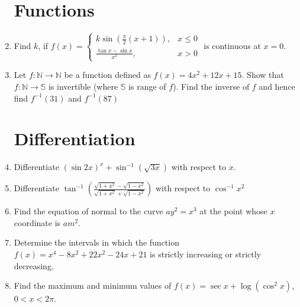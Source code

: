 \documentclass[12pt,-letter paper]{article}
\providecommand{\brak}[1]{\ensuremath{\left(#1\right)}}
\theoremstyle{remark}
\begin{document}
\begin{enumerate}
\section{Functions}
\item Find $k$, if $f(x) = 
    \begin{cases} 
        k \sin \brak{\frac{\pi}{2}\brak{x+1}},& x \leq 0 \\ 
        \frac{\tan x - \sin x}{x^3},& x > 0 
    \end{cases}$ is continuous at $x = 0$.
\item Let $f : \mathbb{N} \xrightarrow{} \mathbb{N}$ be a function defined as $f(x) = 4x^2 + 12x + 15$. Show that $f : \mathbb{N} \xrightarrow{} \mathbb{S}$ is invertible (where $\mathbb{S}$ is range of $f$). Find the inverse of $f$ and hence find $f^{-1}(31)$ and $f^{-1}(87)$
\section{Differentiation}
\item Differentiate $\brak{\sin 2x}^x + \sin^{-1}\brak{\sqrt{3x}}$ with respect to $x$.
\item Differentiate $\tan^{-1}\brak{\frac{\sqrt{1 + x^2} - \sqrt{1 - x^2}}{\sqrt{1 + x^2} + \sqrt{1 - x^2}}}$ with respect to $\cos^{-1}x^2$
\item Find the equation of normal to the curve $ay^2 = x^3$ at the point whose $x$ coordinate is $am^2$.
\item Determine the intervals in which the function $f(x) = x^4 - 8x^2 + 22x^2 - 24x +21$ is strictly increasing or strictly decreasing.
\item Find the maximum and minimum values of $f(x) = \sec x + \log\brak{\cos^2 x}$, $0 < x < 2\pi$.

\end{enumerate}
\end{document}

